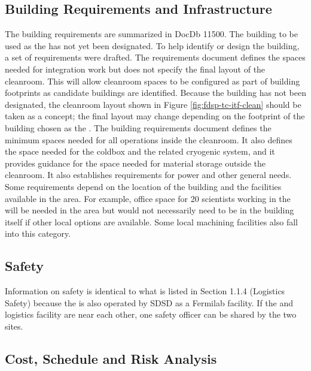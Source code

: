 \subsection{Building Requirements and Infrastructure}
\label{sec:fdsp-tc-itf-req}
The  building requirements are summarized in DocDb 11500.\cite{bib:docdb11500} The building to be used as the  has not yet been designated. To help identify or design the  building, a set of requirements were drafted. The requirements document defines the spaces needed for integration work but does not specify the final layout of the cleanroom. This will allow cleanroom spaces to be configured as part of building footprints as candidate buildings are identified. Because the building has not been designated, the cleanroom layout shown in Figure \ref{fig:fdsp-tc-itf-clean} should be taken as a concept; the final layout may change depending on the footprint of the building chosen as the . The building requirements document\cite{docdb-11500}  defines the minimum spaces needed for all operations inside the  cleanroom. It also defines the space needed for the coldbox and the related cryogenic system, and it provides guidance for the space needed for material storage outside the cleanroom. It also establishes requirements for power and other general needs. Some requirements depend on the location of the building and the facilities available in the area. For example, office space for 20 scientists working in the  will be needed in the area but would not necessarily need to be in the  building itself if other local options are available. Some local machining facilities also fall into this category. 

\subsection{Safety}
\label{sec:fdsp-tc-itf-safety}

Information on  safety is identical to what is listed in Section 1.1.4 (Logistics Safety) because the  is also operated by SDSD as a Fermilab facility.    If the  and logistics facility are near each other, one safety officer can be shared by the two sites.    

\subsection{Cost, Schedule and Risk Analysis}
\label{sec:fdsp-tc-itf-cost}

